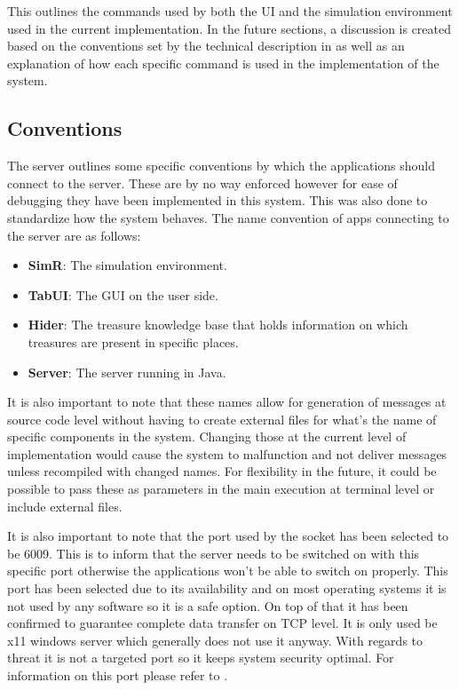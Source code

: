     This outlines the commands used by both the UI and the simulation environment used in the current implementation. In the future sections, a discussion is created based on the conventions set by the technical description in \cite{technical} as well as an explanation of how each specific command is used in the implementation of the system.

    \subsection{Conventions}
      The server outlines some specific conventions by which the applications should connect to the server. These are by no way enforced however for ease of debugging they have been implemented in this system. This was also done to standardize how the system behaves. The name convention of apps connecting to the server are as follows:

        \begin{itemize}
          \item \textbf{SimR}: The simulation environment.
          \item \textbf{TabUI}: The GUI on the user side.
          \item \textbf{Hider}: The treasure knowledge base that holds information on which treasures are present in specific places.
          \item \textbf{Server}: The server running in Java.
        \end{itemize}

      It is also important to note that these names allow for generation of messages at source code level without having to create external files for what's the name of specific components in the system. Changing those at the current level of implementation would cause the system to malfunction and not deliver messages unless recompiled with changed names. For flexibility in the future, it could be possible to pass these as parameters in the main execution at terminal level or include external files.

      It is also important to note that the port used by the socket has been selected to be 6009. This is to inform that the server needs to be switched on with this specific port otherwise the applications won't be able to switch on properly. This port has been selected due to its availability and on most operating systems it is not used by any software so it is a safe option. On top of that it has been confirmed to guarantee complete data transfer on TCP level. It is only used be x11 windows server which generally does not use it anyway. With regards to threat it is not a targeted port so it keeps system security optimal. For information on this port please refer to \cite{port6009}.

